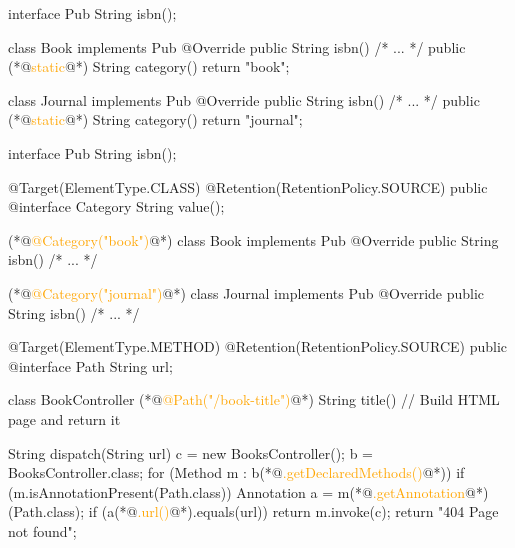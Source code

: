 \documentclass{article}
\begin{document}

\begin{lnSnippet}
interface Pub
  String isbn();

class Book implements Pub
  @Override public String isbn()
    /* ... */
  public (*@\textcolor{orange}{static}@*) String category()
    return "book";

class Journal implements Pub
  @Override public String isbn()
    /* ... */
  public (*@\textcolor{orange}{static}@*) String category()
    return "journal";
\end{lnSnippet}
\begin{lnSnippet}
interface Pub
  String isbn();

@Target(ElementType.CLASS)
@Retention(RetentionPolicy.SOURCE)
public @interface Category
  String value();

(*@\textcolor{orange}{@Category("book")}@*)
class Book implements Pub
  @Override public String isbn()
    /* ... */

(*@\textcolor{orange}{@Category("journal")}@*)
class Journal implements Pub
  @Override public String isbn()
    /* ... */
\end{lnSnippet}

\begin{lnSnippet}
@Target(ElementType.METHOD)
@Retention(RetentionPolicy.SOURCE)
public @interface Path
  String url;

class BookController
  (*@\textcolor{orange}{@Path("/book-title")}@*)
  String title()
    // Build HTML page and return it
\end{lnSnippet}
\begin{lnSnippet}
String dispatch(String url) {
  c = new BooksController();
  b = BooksController.class;
  for (Method m : b(*@\textcolor{orange}{.getDeclaredMethods()}@*)) {
    if (m.isAnnotationPresent(Path.class)) {
      Annotation a = m(*@\textcolor{orange}{.getAnnotation}@*)(Path.class);
      if (a(*@\textcolor{orange}{.url()}@*).equals(url)) {
        return m.invoke(c);
      }
    }
  }
  return "404 Page not found";
}
\end{lnSnippet}
\end{document}
